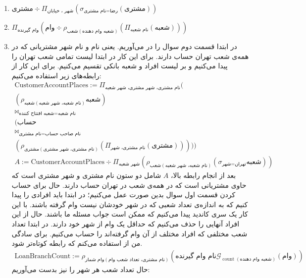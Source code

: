 \begin{enumerate}
    \item $\text{مشتری} \div \Pi_{\text{شهر ، خیابان}}(\sigma_{\text{نام مشتری} = \text{رضا}}(\text{مشتری}))$
    \item $\Pi_{\text{وام گیرنده}}(\text{وام} \div \rho_{\text{شعب}(\text{شعبه وام دهنده})} (\Pi_{\text{نام شعبه}}(\text{شعبه})))$
    \item در ابتدا قسمت دوم سوال را در می‌آوریم. یعنی نام و نام شهر مشتریانی که در همه‌ی شعب تهران حساب دارند.
    برای این کار در ابتدا لیست تمامی شعب تهران را پیدا می‌کنیم و بر لیست افراد و شعبه بانکی تقسیم می‌کنیم.
    برای این کار از رابطه‌های زیر استفاده می‌کنیم:
    \begin{gather*}
        \text{CustomerAccountPlaces} := \Pi_{\text{نام مشتری، شهر مشتری، شهر شعبه}}(
        \\
        (\rho_{\text{شعبه}(\text{نام شعبه، شهر شعبه})}\text{شعبه})
        \\
        \bowtie_{\text{شعبه افتتاح کننده}=\text{نام شعبه}}
        \\
        (\text{حساب}
        \\
        \bowtie_{\text{نام مشتری}=\text{نام صاحب حساب}}
        \\(\rho_{\text{مشتری}(\text{نام مشتری، شهر مشتری})}(\Pi_{\text{نام مشتری، شهر}}(\text{مشتری})))))
        \\
        A := \text{CustomerAccountPlaces} \div \Pi_{\text{شهر شعبه}}(\rho_{\text{شعب}(\text{نام شعبه، شهر شعبه})}(\sigma_{\text{شهر}=\text{تهران}}\text{شعبه}))
    \end{gather*}
    بعد از انجام رابطه بالا،
    $A$
    شامل دو ستون نام مشتری و شهر مشتری است که حاوی مشتریانی است که در همه‌ی شعب در تهران حساب دارند.
    حال برای حساب کردن قسمت اول سوال بدین صورت عمل می‌کنیم؛ در ابتدا باید افرادی را پیدا کنیم که به اندازه‌ی
    تعداد شعبی که در شهر خودشان نیست وام گرفته باشند. با این کار یک سری کاندید پیدا می‌کنیم که ممکن است
    جواب مسئله ما باشند. حال از این افراد آنهایی را حذف می‌کنیم که حداقل یک وام از شهر خود دارند.
    در ابتدا تعداد شعب مختلفی که افراد مختلف از آن وام گرفته‌اند را حساب می‌کنیم.
    برای سادگی من از
    استفاده می‌کنم که رابطه کوتاه‌تر شود.
    \begin{gather*}
        \text{LoanBranchCount} := \rho_{\text{وام‌ شمار}(\text{نام مشتری، تعداد شعب وام})} (\text{نام وام گیرنده} \mathcal{G}_{\operatorname{count}(\text{شعبه وام دهنده})}(\text{وام}))
    \end{gather*}
    حال تعداد شعب هر شهر را نیز بدست می‌آوریم:

\end{enumerate}
